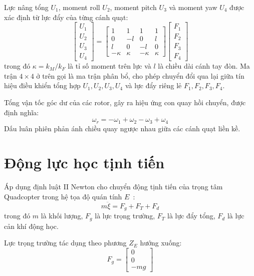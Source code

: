 \documentclass[12pt,a4paper]{report}
\begin{document}
Lực nâng tổng $U_1$, moment roll $U_2$, moment pitch $U_3$ và moment yaw $U_4$ được xác định từ lực đẩy của từng cánh quạt:
\begin{equation}
\begin{bmatrix} U_1 \\[4pt] U_2 \\[4pt] U_3 \\[4pt] U_4 \end{bmatrix}
=
\begin{bmatrix}
1    & 1     & 1    & 1     \\[4pt]
0    & -l    & 0    & l     \\[4pt]
l    & 0     & -l   & 0     \\[4pt]
-\kappa & \kappa & -\kappa & \kappa
\end{bmatrix}
\begin{bmatrix} F_1 \\[4pt] F_2 \\[4pt] F_3 \\[4pt] F_4 \end{bmatrix}
\end{equation}
trong đó $\kappa = k_M / k_F$ là tỉ số moment trên lực và $l$ là chiều dài cánh tay đòn. Ma trận $4 \times 4$ ở trên gọi là ma trận phân bổ, cho phép chuyển đổi qua lại giữa tín hiệu điều khiển tổng hợp $U_1, U_2, U_3, U_4$ và lực đẩy riêng lẻ $F_1, F_2, F_3, F_4$.

Tổng vận tốc góc dư của các rotor, gây ra hiệu ứng con quay hồi chuyển, được định nghĩa:
\begin{equation}
\omega_r = -\omega_1 + \omega_2 - \omega_3 + \omega_4
\end{equation}
Dấu luân phiên phản ánh chiều quay ngược nhau giữa các cánh quạt liền kề.

\section{Động lực học tịnh tiến}
Áp dụng định luật II Newton cho chuyển động tịnh tiến của trọng tâm Quadcopter trong hệ tọa độ quán tính $E$~\cite{bouabdallah2004,khalil2002}:
\begin{equation}
m \ddot{\xi} = F_g + F_T + F_d
\end{equation}
trong đó $m$ là khối lượng, $F_g$ là lực trọng trường, $F_T$ là lực đẩy tổng, $F_d$ là lực cản khí động học.

Lực trọng trường tác dụng theo phương $Z_E$ hướng xuống:
\begin{equation}
F_g = \begin{bmatrix} 0 \\ 0 \\ -mg \end{bmatrix}
\end{equation}
\end{document}
